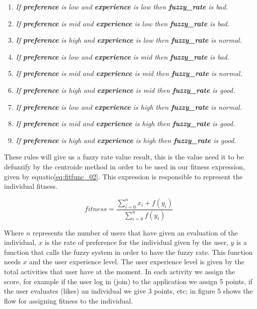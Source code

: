 \begin{enumerate}
	\item \textit{If \textbf{preference} is low and
		\textbf{experience} is low then \textbf{fuzzy\_rate} is bad.}
	\item \textit{If \textbf{preference} is mid and
		\textbf{experience} is low  then \textbf{fuzzy\_rate} is bad.}
	\item \textit{If \textbf{preference} is high and
		\textbf{experience} is low  then \textbf{fuzzy\_rate} is normal.}
	\item \textit{If \textbf{preference} is low and
		\textbf{experience} is mid then \textbf{fuzzy\_rate} is bad.}
	\item \textit{If \textbf{preference} is mid and
		\textbf{experience} is mid  then \textbf{fuzzy\_rate} is normal.}
	\item \textit{If \textbf{preference} is high and
		\textbf{experience} is mid  then \textbf{fuzzy\_rate} is good.}
	\item \textit{If \textbf{preference} is low and
		\textbf{experience} is high then \textbf{fuzzy\_rate} is normal.}
	\item \textit{If \textbf{preference} is mid and
		\textbf{experience} is high  then \textbf{fuzzy\_rate} is good.}
	\item \textit{If \textbf{preference} is high and
		\textbf{experience} is high  then \textbf{fuzzy\_rate} is good.}

\end{enumerate}

These rules will give us a fuzzy rate value result, this is the value need it to
be defuzzify by the centroide method in order to be used in our fitness
expression, given by equatio\ref{eq:fitfunc_02}. This expression is responsible
to represent the individual fitness.

\begin{equation}\label{eq:fitfunc_02}
\displaystyle fitness=\frac{\sum_{i=0}^{n}x_{i}+f(y_{i})}{\sum_{i=0}^{n}f(y_{i})}
\end{equation}

Where $n$ represents  the number of  users that  have given an evaluation of the
individual, $x$ is the rate of preference for the  individual  given by  the user,
$y$ is a function that calls the fuzzy system in order to have the fuzzy rate.
This function needs $x$ and the user experience level. The user experience level
is given  by the  total activities that user have at the moment. In each
activity we assign the score, for example if the user log in (join) to the
application we assign 5 points, if the user evaluates (likes) an individual we
give 3 points, etc; in figure 5 shows the flow for assigning fitness to
the individual.
